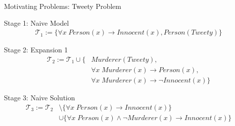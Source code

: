 \documentclass[8pt]{beamer}
\begin{document}
\begin{frame}{Motivating Problems: Tweety Problem}

\begin{block}{Stage 1: Naive Model}
\begin{equation*}
\begin{split}
\mathcal{T}_1:= \{ \forall x \; Person(x) \to Innocent(x), Person(Tweety) \} 
\end{split}
\end{equation*}
\end{block}
\begin{block}{Stage 2: Expansion 1}
\begin{equation*}
\begin{split}
\mathcal{T}_2:= \mathcal{T}_1   \cup \{& Murderer(Tweety),\\
&\forall x \; Murderer(x) \to Person(x), \\
&\forall x \; Murderer(x) \to \neg Innocent(x)\}
\end{split}
\end{equation*}
\end{block}
\begin{block}{Stage 3: Naive Solution}
\begin{equation*}
\begin{split}
\mathcal{T}_3:= \mathcal{T}_2 &\setminus \{ \forall x \; Person(x) \to Innocent(x)\} \\
& \cup \{ \forall x \; Person(x) \wedge \neg Murderer(x) \to Innocent(x)\} \\
\end{split}
\end{equation*}
\end{block} 

\end{frame}
\end{document}
